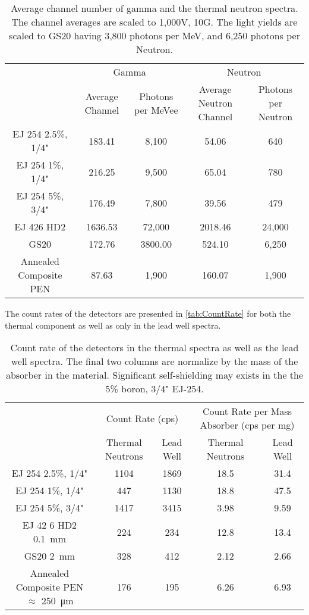 \documentclass[onecolumn]{IEEEtran}
\begin{document}
\begin{table}
  \centering
  \caption[Average Channel Number of Gamma and Neutron Spectra]{Average channel number of gamma and the thermal neutron spectra.  The channel averages are scaled to 1,000V, 10G. The light yields are scaled to GS20 having 3,800 photons per MeV, and 6,250 photons per Neutron.}
  \label{tab:AvgChNG}
  \begin{tabular}{c| c c |c c}
    \toprule
        &\multicolumn{2}{|c|}{Gamma}&\multicolumn{2}{|c}{Neutron}\\
        & Average Channel& Photons per MeVee & Average Neutron Channel & Photons per Neutron\\
    \midrule
    EJ 254 2.5\%, 1/4"&	183.41	&	8,100	&	54.06	&	640	\\
    EJ 254 1\%, 1/4"&	216.25	&	9,500	&	65.04	&	780	\\
    EJ 254 5\%, 3/4"&	176.49	&	7,800	&	39.56	&	479	\\
    EJ 426 HD2&	1636.53	&	72,000	&	2018.46	&	24,000	\\
    GS20 &	172.76	&	3800.00	&	524.10	&	6,250	\\
    Annealed Composite PEN&	87.63	&	1,900	&	160.07	&	1,900	\\
    \bottomrule
  \end{tabular}
\end{table}
The count rates of the detectors are presented in \autoref{tab:CountRate} for both the thermal component as well as only in the lead well spectra.
\begin{table}
\centering
  \caption[Detector Count Rate]{Count rate of the detectors in the thermal spectra as well as the lead well spectra.  The final two columns are normalize by the mass of the absorber in the material. Significant self-shielding may exists in the the 5\% boron, 3/4" EJ-254.}
  \label{tab:CountRate}
  \begin{tabular}{c | c c| c c}
  \toprule
    &\multicolumn{2}{|c|}{Count Rate (cps)}&\multicolumn{2}{|c}{Count Rate per Mass Absorber (cps per mg)} \\
    & Thermal Neutrons &Lead Well & Thermal Neutrons & Lead Well\\
  \midrule
  EJ 254 2.5\%, 1/4"&	1104	&	1869	&	18.5	&	31.4	\\
  EJ 254 1\%, 1/4"&	447	&	1130	&	18.8	&	47.5	\\
  EJ 254 5\%, 3/4"&	1417	&	3415	&	3.98	&	9.59	\\
  EJ 42 6 HD2 \SI{0.1}{\mm}&	224	&	234	&	12.8	&	13.4	\\
  GS20 \SI{2}{\mm}&	328	&	412	&	2.12	&	2.66	\\
  Annealed Composite PEN $\approx$ \SI{250}{\um}&	176	&	195	&	6.26	&	6.93	\\
  \bottomrule
  \end{tabular}
\end{table}
\end{document}
